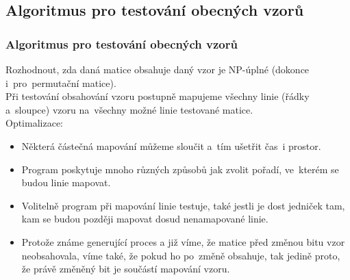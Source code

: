 \documentclass{beamer}
\begin{document}
\subsection{Algoritmus pro testování obecných vzorů}
\begin{frame}
\frametitle{Algoritmus pro testování obecných vzorů}
Rozhodnout, zda daná matice obsahuje daný vzor je NP-úplné (dokonce
i~pro~permutační matice).\\
\pause
\vspace{1em}
Při testování obsahování vzoru postupně mapujeme všechny linie (řádky a~sloupce) vzoru na~všechny možné linie testované matice.\\
\vspace{1em}
Optimalizace:
\begin{itemize}
\item Některá částečná mapování můžeme sloučit a~tím ušetřit čas~i prostor.
\pause
\item Program poskytuje mnoho různých způsobů jak zvolit pořadí, ve~kterém se budou linie mapovat.
\pause
\item Volitelně program při mapování linie testuje, také jestli je dost jedniček tam, kam se budou později mapovat dosud nenamapované linie.
\pause
\item Protože známe generující proces a již víme, že matice před změnou bitu vzor neobsahovala, víme také, že pokud ho po~změně obsahuje, tak jedině proto, že právě změněný bit je součástí mapování vzoru.
\end{itemize}
\end{frame}
\end{document}
